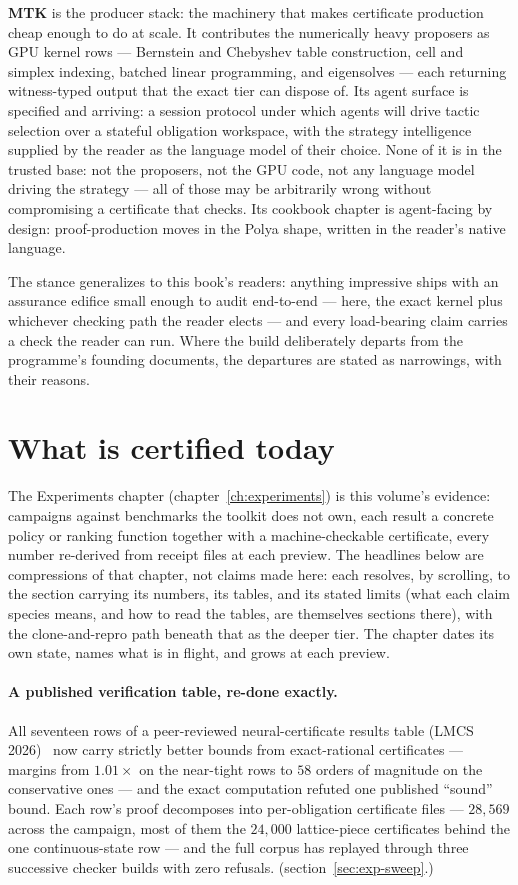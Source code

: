 \textbf{MTK} is the producer stack: the machinery that makes
certificate production cheap enough to do at scale. It contributes the
numerically heavy proposers as GPU kernel rows --- Bernstein and
Chebyshev table construction, cell and simplex indexing, batched linear
programming, and eigensolves --- each returning witness-typed output that
the exact tier can dispose of. Its agent surface is specified and
arriving: a session protocol under which agents will drive tactic
selection over a stateful obligation workspace, with the strategy
intelligence supplied by the reader as the language model of their
choice. None of it is in the trusted base: not the proposers, not the
GPU code, not any language model driving the strategy --- all of those
may be arbitrarily wrong without compromising a certificate that
checks. Its cookbook chapter is agent-facing by design:
proof-production moves in the Polya shape, written in the reader's
native language.

The stance generalizes to this book's readers: anything impressive
ships with an assurance edifice small enough to audit end-to-end ---
here, the exact kernel plus whichever checking path the reader elects
--- and every load-bearing claim carries a check the reader can run.
Where the build deliberately departs from the programme's founding
documents, the departures are stated as narrowings, with their
reasons.

\section*{What is certified today}

The Experiments chapter (chapter~\ref{ch:experiments}) is this
volume's evidence: campaigns against benchmarks the toolkit does not
own, each result a concrete policy or ranking function together with a
machine-checkable certificate, every number re-derived from receipt
files at each preview. The headlines below are compressions of that
chapter, not claims made here: each resolves, by scrolling, to the
section carrying its numbers, its tables, and its stated limits
(what each claim species means, and how to read the tables, are
themselves sections there), with the clone-and-repro path beneath
that as the deeper tier. The chapter dates its own state, names what
is in flight, and grows at each preview.

\paragraph{A published verification table, re-done exactly.}
 All
seventeen rows of a peer-reviewed neural-certificate results table
(LMCS 2026)~\cite{abate23} now carry strictly better bounds from exact-rational
certificates --- margins from $1.01\times$ on the near-tight rows to
$58$ orders of magnitude on the conservative ones --- and the exact
computation refuted one published ``sound'' bound. Each row's proof
decomposes into per-obligation certificate files --- $28{,}569$
across the campaign, most of them the $24{,}000$ lattice-piece
certificates behind the one continuous-state row --- and the full
corpus has replayed through three successive checker builds with zero
refusals.
(section~\ref{sec:exp-sweep}.)

